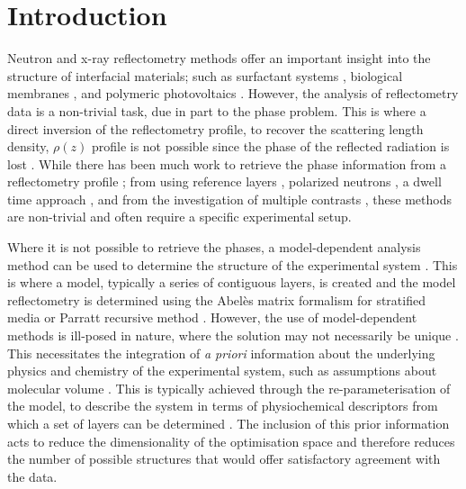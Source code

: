 \documentclass[
 reprint,
 superscriptaddress,
 amsmath,amssymb,
 aps,
]{revtex4-1}
\begin{document}
\maketitle

\section{\label{intro} Introduction}

Neutron and x-ray reflectometry methods offer an important insight into the structure of interfacial materials; such as surfactant systems \cite{mccluskey_bayesian_2019}, biological membranes \cite{clifton_self_2019}, and polymeric photovoltaics \cite{perez_determination_2019}. 
However, the analysis of reflectometry data is a non-trivial task, due in part to the phase problem. 
This is where a direct inversion of the reflectometry profile, to recover the scattering length density, $\rho(z)$ profile is not possible since the phase of the reflected radiation is lost \cite{majkrzak_exact_1995}.
While there has been much work to retrieve the phase information from a reflectometry profile \cite{kirby_phase_2012}; from using reference layers \cite{majkrzak_exact_1995,haan_retrieval_1995,majkrzak_phase_2003,nikova_novel_2019}, polarized neutrons \cite{leeb_determination_1998}, a dwell time approach \cite{fiedeldey_proposal_1992}, and from the investigation of multiple contrasts \cite{majkrzak_exact_1998,majkrzak_first_2000,majkrzak_phase_2003,koutsioubas_model_2019}, these methods are non-trivial and often require a specific experimental setup. 

Where it is not possible to retrieve the phases, a model-dependent analysis method can be used to determine the structure of the experimental system \cite{pedersen_analysis_1994,haan_genetic_1994,nelson_motofit_2006,lee_comparison_2007,gerelli_aurore_2016,gerelli_aurore_2016b,nelson_refnx_2019}.
This is where a model, typically a series of contiguous layers, is created and the model reflectometry is determined using the Abel\`{e}s matrix formalism for stratified media \cite{abeles_propagation_1948} or Parratt recursive method \cite{parratt_surface_1954}.
However, the use of model-dependent methods is ill-posed in nature, where the solution may not necessarily be unique \cite{klibanov_phaseless_1992,klibanov_use_1994}.
This necessitates the integration of \emph{a priori} information about the underlying physics and chemistry of the experimental system, such as assumptions about molecular volume \cite{waldie_localization_2018,campbell_structure_2018,mccluskey_bayesian_2019}. 
This is typically achieved through the re-parameterisation of the model, to describe the system in terms of physiochemical descriptors from which a set of layers can be determined \cite{schalke_structural_2000,heinrich_zooming_2014,heinrich_deuteration_2016}. 
The inclusion of this prior information acts to reduce the dimensionality of the optimisation space and therefore reduces the number of possible structures that would offer satisfactory agreement with the data. 
\end{document}
